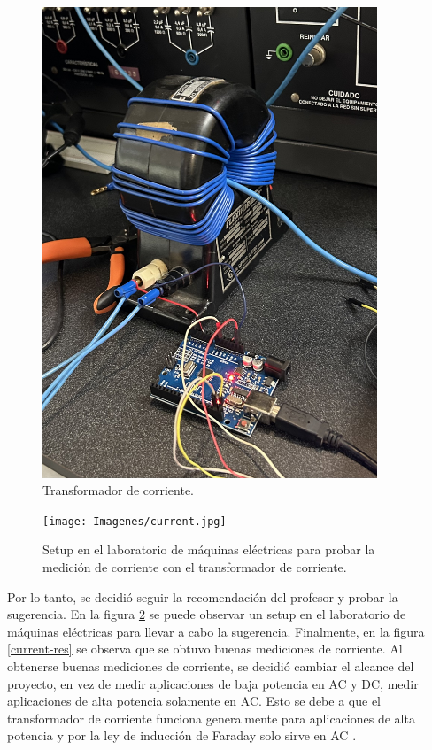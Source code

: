\begin{figure}
    \centering
    \includegraphics[width=10cm]{Imagenes/flexiformer.jpeg}
    \caption{Transformador de corriente.}
    \label{flexifomer}
\end{figure}

\begin{figure}
    \centering
    \texttt{[image: Imagenes/current.jpg]}
    \caption{Setup en el laboratorio de máquinas eléctricas para probar la medición de corriente con el transformador de corriente.}
    \label{current-test}
\end{figure}

Por lo tanto, se decidió seguir la recomendación del profesor y probar la sugerencia. En la figura \ref{current-test} se puede observar un setup en el laboratorio de máquinas eléctricas para llevar a cabo la sugerencia. Finalmente, en la figura \ref{current-res} se observa que se obtuvo buenas mediciones de corriente. Al obtenerse buenas mediciones de corriente, se decidió cambiar el alcance del proyecto, en vez de medir aplicaciones de baja potencia en AC y DC, medir aplicaciones de alta potencia solamente en AC. Esto se debe a que el transformador de corriente funciona generalmente para aplicaciones de alta potencia y por la ley de inducción de Faraday solo sirve en AC \cite{hayt}. 

